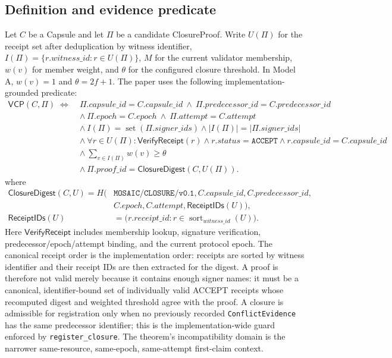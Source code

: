 \documentclass{ledger}
\begin{document}
\subsection{Definition and evidence predicate}
Let $C$ be a Capsule and let $\Pi$ be a candidate ClosureProof. Write $U(\Pi)$ for the receipt set after deduplication by witness identifier, $I(\Pi)=\{r.\mathit{witness\_id}:r\in U(\Pi)\}$, $M$ for the current validator membership, $w(v)$ for member weight, and $\theta$ for the configured closure threshold. In Model A, $w(v)=1$ and $\theta=2f+1$. The paper uses the following implementation-grounded predicate:
\begin{align*}
\mathsf{VCP}(C,\Pi)\;\Longleftrightarrow\;&\Pi.\mathit{capsule\_id}=C.\mathit{capsule\_id}\ \land\ \Pi.\mathit{predecessor\_id}=C.\mathit{predecessor\_id}\\
&\land\ \Pi.\mathit{epoch}=C.\mathit{epoch}\ \land\ \Pi.\mathit{attempt}=C.\mathit{attempt}\\
&\land\ I(\Pi)=\operatorname{set}(\Pi.\mathit{signer\_ids})\land |I(\Pi)|=|\Pi.\mathit{signer\_ids}|\\
&\land\ \forall r\in U(\Pi):\mathsf{VerifyReceipt}(r)\land r.\mathit{status}=\texttt{ACCEPT}\land r.\mathit{capsule\_id}=C.\mathit{capsule\_id}\\
&\land\ \sum_{v\in I(\Pi)}w(v)\geq\theta\\
&\land\ \Pi.\mathit{proof\_id}=\mathsf{ClosureDigest}(C,U(\Pi)).
\end{align*}
where
\begin{equation}
\begin{aligned}
\mathsf{ClosureDigest}(C,U)=H\!\bigl(&\texttt{MOSAIC/CLOSURE/v0.1},C.\mathit{capsule\_id},C.\mathit{predecessor\_id},\\
& C.\mathit{epoch},C.\mathit{attempt},\mathsf{ReceiptIDs}(U)\bigr),\\
\mathsf{ReceiptIDs}(U)&=\bigl(r.\mathit{receipt\_id}:r\in\operatorname{sort}_{\mathit{witness\_id}}(U)\bigr).
\end{aligned}
\end{equation}
Here $\mathsf{VerifyReceipt}$ includes membership lookup, signature verification, predecessor/epoch/attempt binding, and the current protocol epoch. The canonical receipt order is the implementation order: receipts are sorted by witness identifier and their receipt IDs are then extracted for the digest. A proof is therefore not valid merely because it contains enough signer names: it must be a canonical, identifier-bound set of individually valid ACCEPT receipts whose recomputed digest and weighted threshold agree with the proof. A closure is admissible for registration only when no previously recorded \texttt{ConflictEvidence} has the same predecessor identifier; this is the implementation-wide guard enforced by \texttt{register\_closure}. The theorem's incompatibility domain is the narrower same-resource, same-epoch, same-attempt first-claim context.
\end{document}

